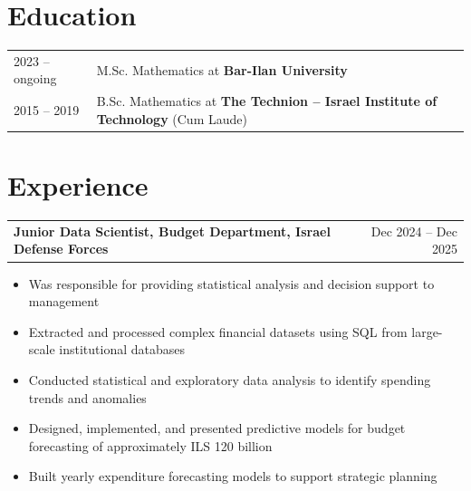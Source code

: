 \documentclass[a4paper,12pt]{article}
\makeatletter
\newenvironment{joblong}[2]
    {
    \begin{tabularx}{\linewidth}{@{}l X r@{}}
    \textbf{#1} & \hfill &  #2 \\[3.75pt]
    \end{tabularx}
    \begin{minipage}[t]{\linewidth}
    \begin{itemize}[nosep,after=\strut, leftmargin=1em, itemsep=3pt,label=--]
    }
    {
    \end{itemize}
    \end{minipage}    
    }
\makeatother
\begin{document}
\section{Education}
\begin{tabularx}{\linewidth}{@{}l X@{}}    
2023 -- ongoing & M.Sc. Mathematics at \textbf{Bar-Ilan University} \\
2015 -- 2019 & B.Sc. Mathematics at \textbf{The Technion -- Israel Institute of Technology} (Cum Laude)
\end{tabularx}

\section{Experience}

\begin{joblong}{Junior Data Scientist, Budget Department, Israel Defense Forces}{Dec 2024 -- Dec 2025}
    \item Was responsible for providing statistical analysis and decision support to management
    \item Extracted and processed complex financial datasets using SQL from large-scale institutional databases
    \item Conducted statistical and exploratory data analysis to identify spending trends and anomalies
    \item Designed, implemented, and presented predictive models for budget forecasting of approximately ILS 120 billion
    \item Built yearly expenditure forecasting models to support strategic planning
\end{joblong}
\end{document}
